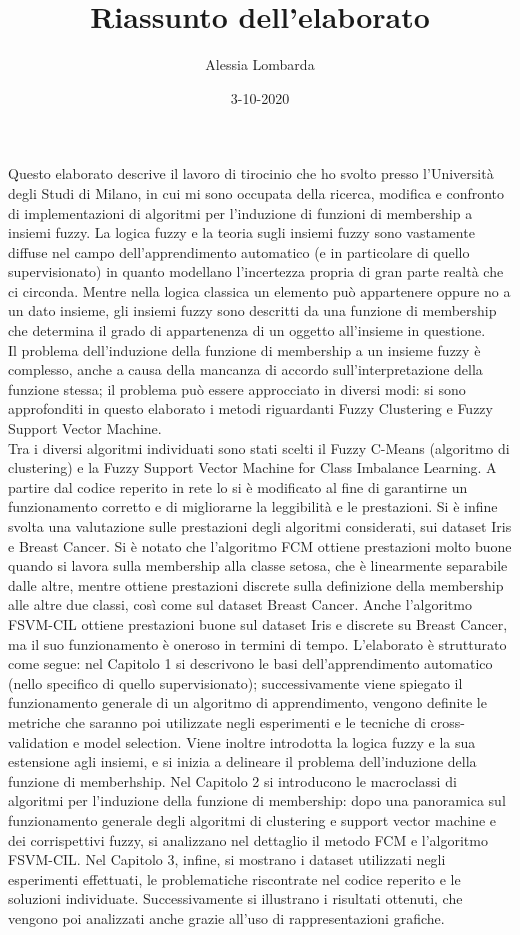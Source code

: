 \documentclass[oneside, openany]{book}
\title{Riassunto dell'elaborato}
\date{3-10-2020}
\author{Alessia Lombarda}
\begin{document}
	Questo elaborato descrive il lavoro di tirocinio che ho svolto presso l'Università degli Studi di Milano, in cui mi sono occupata della ricerca, modifica e confronto di implementazioni di algoritmi per l'induzione di funzioni di membership a insiemi fuzzy. La logica fuzzy e la teoria sugli insiemi fuzzy sono vastamente diffuse nel campo dell'apprendimento automatico (e in particolare di quello supervisionato) in quanto modellano l'incertezza propria di gran parte realtà che ci circonda. Mentre nella logica classica un elemento può appartenere oppure no a un dato insieme, gli insiemi fuzzy sono descritti da una funzione di membership che determina il grado di appartenenza di un oggetto all'insieme in questione.\\
	Il problema dell'induzione della funzione di membership a un insieme fuzzy è complesso, anche a causa della mancanza di accordo sull'interpretazione della funzione stessa; il problema può essere approcciato in diversi modi: si sono approfonditi in questo elaborato i metodi riguardanti Fuzzy Clustering e Fuzzy Support Vector Machine.\\
	Tra i diversi algoritmi individuati sono stati scelti il Fuzzy C-Means (algoritmo di clustering) e la Fuzzy Support Vector Machine for Class Imbalance Learning. A partire dal codice reperito in rete lo si è modificato al fine di garantirne un funzionamento corretto e di migliorarne la leggibilità e le prestazioni. Si è infine svolta una valutazione sulle prestazioni degli algoritmi considerati, sui dataset Iris e Breast Cancer. Si è notato che l'algoritmo FCM ottiene prestazioni molto buone quando si lavora sulla membership alla classe setosa, che è linearmente separabile dalle altre, mentre ottiene prestazioni discrete sulla definizione della membership alle altre due classi, così come sul dataset Breast Cancer. Anche l'algoritmo FSVM-CIL ottiene prestazioni buone sul dataset Iris e discrete su Breast Cancer, ma il suo funzionamento è oneroso in termini di tempo.
	L'elaborato è strutturato come segue: nel Capitolo 1 si descrivono le basi dell'apprendimento automatico (nello specifico di quello supervisionato); successivamente viene spiegato il funzionamento generale di un algoritmo di apprendimento, vengono definite le metriche che saranno poi utilizzate negli esperimenti e le tecniche di cross-validation e model selection. Viene inoltre introdotta la logica fuzzy e la sua estensione agli insiemi, e si inizia a delineare il problema dell'induzione della funzione di memberhship. Nel Capitolo 2 si introducono le macroclassi di algoritmi per l'induzione della funzione di membership: dopo una panoramica sul funzionamento generale degli algoritmi di clustering e support vector machine e dei corrispettivi fuzzy, si analizzano nel dettaglio il metodo FCM e l'algoritmo FSVM-CIL. Nel Capitolo 3, infine, si mostrano i dataset utilizzati negli esperimenti effettuati, le problematiche riscontrate nel codice reperito e le soluzioni individuate. Successivamente si illustrano i risultati ottenuti, che vengono poi analizzati anche grazie all'uso di rappresentazioni grafiche.
\end{document}
